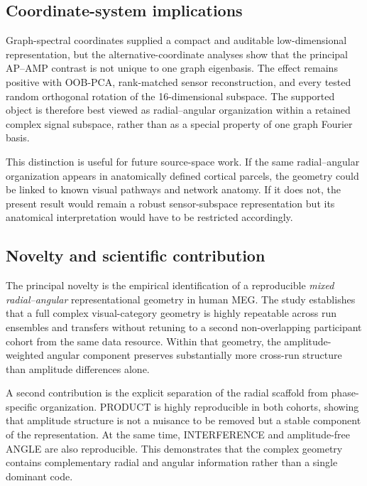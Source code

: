 \documentclass[11pt]{article}
\begin{document}
\subsection{Coordinate-system implications}
Graph-spectral coordinates supplied a compact and auditable low-dimensional representation, but the alternative-coordinate analyses show that the principal AP--AMP contrast is not unique to one graph eigenbasis. The effect remains positive with OOB-PCA, rank-matched sensor reconstruction, and every tested random orthogonal rotation of the 16-dimensional subspace. The supported object is therefore best viewed as radial--angular organization within a retained complex signal subspace, rather than as a special property of one graph Fourier basis.

This distinction is useful for future source-space work. If the same radial--angular organization appears in anatomically defined cortical parcels, the geometry could be linked to known visual pathways and network anatomy. If it does not, the present result would remain a robust sensor-subspace representation but its anatomical interpretation would have to be restricted accordingly.

\subsection{Novelty and scientific contribution}
The principal novelty is the empirical identification of a reproducible \emph{mixed radial--angular} representational geometry in human MEG. The study establishes that a full complex visual-category geometry is highly repeatable across run ensembles and transfers without retuning to a second non-overlapping participant cohort from the same data resource. Within that geometry, the amplitude-weighted angular component preserves substantially more cross-run structure than amplitude differences alone.

A second contribution is the explicit separation of the radial scaffold from phase-specific organization. PRODUCT is highly reproducible in both cohorts, showing that amplitude structure is not a nuisance to be removed but a stable component of the representation. At the same time, INTERFERENCE and amplitude-free ANGLE are also reproducible. This demonstrates that the complex geometry contains complementary radial and angular information rather than a single dominant code.
\end{document}
